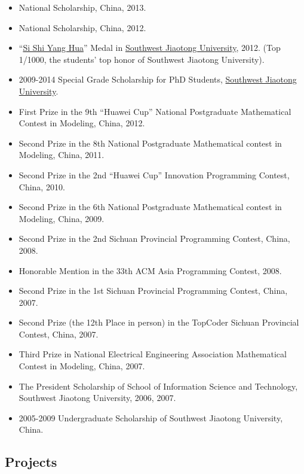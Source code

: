 \documentclass[]{article}
\begin{document}
\begin{itemize}
\itemsep1pt\parskip0pt
\item
  National Scholarship, China, 2013.
\item
  National Scholarship, China, 2012.
\item
  ``\href{http://baike.baidu.com/view/644025.htm}{Si Shi Yang Hua}''
  Medal in \href{http://www.swjtu.edu.cn/}{Southwest Jiaotong
  University}, 2012. (Top 1/1000, the students' top honor of Southwest
  Jiaotong University).
\item
  2009-2014 Special Grade Scholarship for PhD Students,
  \href{http://www.swjtu.edu.cn/}{Southwest Jiaotong University}.
\item
  First Prize in the 9th ``Huawei Cup'' National Postgraduate
  Mathematical Contest in Modeling, China, 2012.
\item
  Second Prize in the 8th National Postgraduate Mathematical contest in
  Modeling, China, 2011.
\item
  Second Prize in the 2nd ``Huawei Cup'' Innovation Programming Contest,
  China, 2010.
\item
  Second Prize in the 6th National Postgraduate Mathematical contest in
  Modeling, China, 2009.
\item
  Second Prize in the 2nd Sichuan Provincial Programming Contest, China,
  2008.
\item
  Honorable Mention in the 33th ACM Asia Programming Contest, 2008.
\item
  Second Prize in the 1st Sichuan Provincial Programming Contest, China,
  2007.
\item
  Second Prize (the 12th Place in person) in the TopCoder Sichuan
  Provincial Contest, China, 2007.
\item
  Third Prize in National Electrical Engineering Association
  Mathematical Contest in Modeling, China, 2007.
\item
  The President Scholarship of School of Information Science and
  Technology, Southwest Jiaotong University, 2006, 2007.
\item
  2005-2009 Undergraduate Scholarship of Southwest Jiaotong University,
  China.
\end{itemize}

\subsection{Projects}\label{projects}
\end{document}
